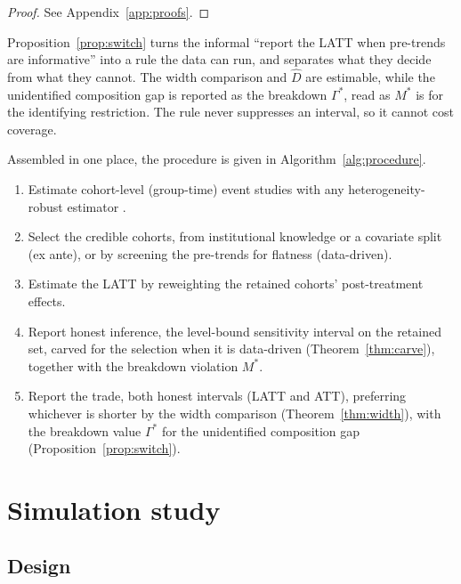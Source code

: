 \documentclass[12pt]{article}
\theoremstyle{remark}
\begin{document}
\begin{proof}
See Appendix~\ref{app:proofs}.
\end{proof}

Proposition~\ref{prop:switch} turns the informal ``report the LATT when pre-trends are informative'' into a
rule the data can run, and separates what they decide from what they cannot. The width comparison and $\hat
D$ are estimable, while the unidentified composition gap is reported as the breakdown $\Gamma^\ast$, read as
$M^\ast$ is for the identifying restriction. The rule never suppresses an interval, so it cannot cost
coverage.

Assembled in one place, the procedure is given in Algorithm~\ref{alg:procedure}.

\begin{algorithm}[H]
\caption{The credible-subpopulation procedure}
\label{alg:procedure}
\begin{enumerate}\setlength\itemsep{2pt}
\item Estimate cohort-level (group-time) event studies with any heterogeneity-robust estimator
\citep{callaway2021, sun2021, borusyak2024, dechaisemartin2020}.
\item Select the credible cohorts, from institutional knowledge or a covariate split (ex ante), or
by screening the pre-trends for flatness (data-driven).
\item Estimate the LATT by reweighting the retained cohorts' post-treatment effects.
\item Report honest inference, the level-bound sensitivity interval on the retained set, carved for
the selection when it is data-driven (Theorem~\ref{thm:carve}), together with the breakdown violation
$M^\ast$.
\item Report the trade, both honest intervals (LATT and ATT), preferring whichever is shorter by the
width comparison (Theorem~\ref{thm:width}), with the breakdown value $\Gamma^\ast$ for the unidentified
composition gap (Proposition~\ref{prop:switch}).
\end{enumerate}
\end{algorithm}

\section{Simulation study}\label{sec:sim}

\subsection{Design}\label{sec:design}
\end{document}
